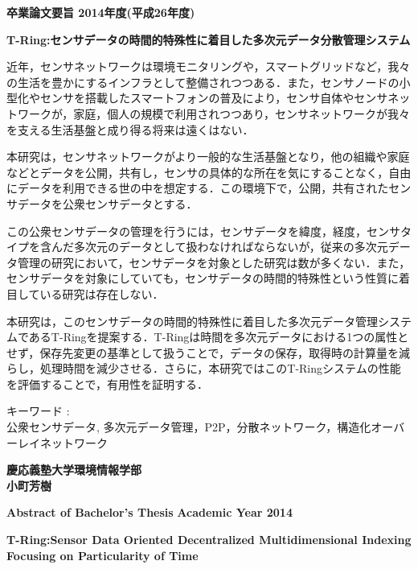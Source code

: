 \begin{center}
\textbf{\Large 卒業論文要旨 2014年度(平成26年度)}

\vspace{6.18mm}

\textbf{\Large T-Ring:センサデータの時間的特殊性に着目した多次元データ分散管理システム}
\end{center}

\vspace{10mm}
近年，センサネットワークは環境モニタリングや，スマートグリッドなど，我々の生活を豊かにするインフラとして整備されつつある．また，センサノードの小型化やセンサを搭載したスマートフォンの普及により，センサ自体やセンサネットワークが，家庭，個人の規模で利用されつつあり，センサネットワークが我々を支える生活基盤と成り得る将来は遠くはない．

本研究は，センサネットワークがより一般的な生活基盤となり，他の組織や家庭などとデータを公開，共有し，センサの具体的な所在を気にすることなく，自由にデータを利用できる世の中を想定する．この環境下で，公開，共有されたセンサデータを公衆センサデータとする．

この公衆センサデータの管理を行うには，センサデータを緯度，経度，センサタイプを含んだ多次元のデータとして扱わなければならないが，従来の多次元データ管理の研究において，センサデータを対象とした研究は数が多くない．また，センサデータを対象にしていても，センサデータの時間的特殊性という性質に着目している研究は存在しない．

本研究は，このセンサデータの時間的特殊性に着目した多次元データ管理システムであるT-Ringを提案する．T-Ringは時間を多次元データにおける1つの属性とせず，保存先変更の基準として扱うことで，データの保存，取得時の計算量を減らし，処理時間を減少させる．さらに，本研究ではこのT-Ringシステムの性能を評価することで，有用性を証明する．

\vspace{10mm}
キーワード :\\
\hspace{3.5em}公衆センサデータ, 多次元データ管理，P2P，分散ネットワーク，構造化オーバーレイネットワーク

\begin{flushright}
\textbf{慶応義塾大学環境情報学部}\\
\textbf{小町芳樹}
\end{flushright}

\newpage

\begin{center}
\textbf{\Large Abstract of Bachelor's Thesis}
\textbf{\Large Academic Year 2014}
\vspace{6.18mm}

\textbf{\Large T-Ring:Sensor Data Oriented Decentralized Multidimensional Indexing Focusing on Particularity of Time}
\end{center}

